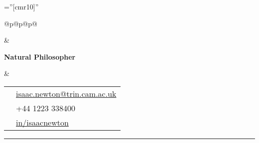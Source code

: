 \documentclass[letterpaper,12pt]{article}
\newcommand{\contactinfo}{%
    {\hlight\color{dark-gray}}
  }
\newcommand{\headline}{
    {\fontsize{14pt}{17pt}\bfseries\color{dark-gray}Natural Philosopher}
  }
\newcommand{\name}{
    \raggedright\fontsize{42pt}{42pt}\bfseries\flushleft\color{dark-gray}{Isaac Newton}
  }
\newcommand{\lighthrule}{
    {\color{light-gray}\par\rule[0mm]{\hsize}{0.5mm}\par\vspace{0.5em}}
  }
\newcommand\Mybox[1]{%
    \setlength\fboxsep{0pt}\fcolorbox{red}{white}{#1}
  }
\begin{document}
\nocite{*}
\pagestyle{empty} %
\font\fb=''[cmr10]'' %
\newlength{\leftwide}
\setlength{\leftwide}{0.34\textwidth}
%
\newlength{\centerwide}
\setlength{\centerwide}{0.33\textwidth}
%
\newlength{\rightwide}
\setlength{\rightwide}{0.28\textwidth}
\begin{tabular}[b]{@{}p{\leftwide}@{}p{\centerwide}@{}p{\rightwide}@{}}
  \noindent
  \begin{minipage}[b]{\leftwide}
    \name
  \end{minipage} & %
  \begin{minipage}[b]{\centerwide}
    \parbox[b][][b]{4.5cm}{\raggedright\headline}
  \end{minipage} & %
  \begin{minipage}[b]{\rightwide}
    \renewcommand\arraystretch{1.25}
    \contactinfo
    \begin{tabular}[b]{@{}cl@{}}
      \faEnvelopeO & \href{mailto:isaac.newton@trin.cam.ac.uk}{isaac.newton@trin.cam.ac.uk}\\ %
      \faPhone & +44 1223 338400\\
      \faLinkedin & \href{http://www.linkedin.com/in/isaacnewton}{in/isaacnewton}
    \end{tabular}
  \end{minipage}
\end{tabular}
\lighthrule
\end{document}
